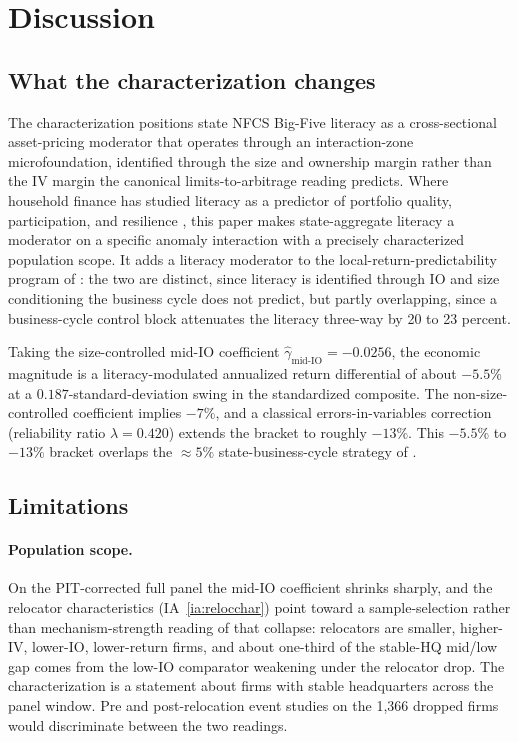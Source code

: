 \section{Discussion}
\label{sec:discussion}

\subsection{What the characterization changes}

The characterization positions state NFCS Big-Five literacy as a cross-sectional asset-pricing moderator that operates through an interaction-zone microfoundation, identified through the size and ownership margin rather than the IV margin the canonical limits-to-arbitrage reading predicts. Where household finance has studied literacy as a predictor of portfolio quality, participation, and resilience \citep{lusardiMitchell2014, calvetCampbellSodini2007, grinblattKeloharjuLinnainmaa2012}, this paper makes state-aggregate literacy a moderator on a specific anomaly interaction with a precisely characterized population scope. It adds a literacy moderator to the local-return-predictability program of \citet{korniotisKumar2013}: the two are distinct, since literacy is identified through IO and size conditioning the business cycle does not predict, but partly overlapping, since a business-cycle control block attenuates the literacy three-way by 20 to 23 percent.

Taking the size-controlled mid-IO coefficient $\hat\gamma_{\text{mid-IO}} = -0.0256$, the economic magnitude is a literacy-modulated annualized return differential of about $-5.5\%$ at a $0.187$-standard-deviation swing in the standardized composite. The non-size-controlled coefficient implies $-7\%$, and a classical errors-in-variables correction (reliability ratio $\lambda = 0.420$) extends the bracket to roughly $-13\%$. This $-5.5\%$ to $-13\%$ bracket overlaps the $\approx 5\%$ state-business-cycle strategy of \citet{korniotisKumar2013}.

\subsection{Limitations}

\paragraph{Population scope.} On the PIT-corrected full panel the mid-IO coefficient shrinks sharply, and the relocator characteristics (IA~\ref{ia:relocchar}) point toward a sample-selection rather than mechanism-strength reading of that collapse: relocators are smaller, higher-IV, lower-IO, lower-return firms, and about one-third of the stable-HQ mid/low gap comes from the low-IO comparator weakening under the relocator drop. The characterization is a statement about firms with stable headquarters across the panel window. Pre and post-relocation event studies on the 1{,}366 dropped firms would discriminate between the two readings.

